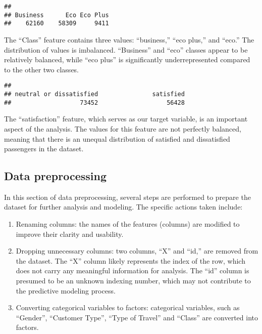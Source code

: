 \documentclass[
]{article}
\newenvironment{Shaded}{\begin{snugshade}}{\end{snugshade}}
\newcommand{\FunctionTok}[1]{\textcolor[rgb]{0.13,0.29,0.53}{\textbf{#1}}}
\newcommand{\NormalTok}[1]{#1}
\newcommand{\SpecialCharTok}[1]{\textcolor[rgb]{0.81,0.36,0.00}{\textbf{#1}}}
\begin{document}
\begin{Shaded}
\end{Shaded}

\begin{verbatim}
## 
## Business      Eco Eco Plus 
##    62160    58309     9411
\end{verbatim}

The ``Class'' feature contains three values: ``business,'' ``eco plus,''
and ``eco.'' The distribution of values is imbalanced. ``Business'' and
``eco'' classes appear to be relatively balanced, while ``eco plus'' is
significantly underrepresented compared to the other two classes.

\begin{Shaded}
\end{Shaded}

\begin{verbatim}
## 
## neutral or dissatisfied               satisfied 
##                   73452                   56428
\end{verbatim}

The ``satisfaction'' feature, which serves as our target variable, is an
important aspect of the analysis. The values for this feature are not
perfectly balanced, meaning that there is an unequal distribution of
satisfied and dissatisfied passengers in the dataset.

\hypertarget{data-preprocessing}{%
\subsection{Data preprocessing}\label{data-preprocessing}}

In this section of data preprocessing, several steps are performed to
prepare the dataset for further analysis and modeling. The specific
actions taken include:

\begin{enumerate}
\def\labelenumi{\arabic{enumi}.}
\item
  Renaming columns: the names of the features (columns) are modified to
  improve their clarity and usability.
\item
  Dropping unnecessary columns: two columns, ``X'' and ``id,'' are
  removed from the dataset. The ``X'' column likely represents the index
  of the row, which does not carry any meaningful information for
  analysis. The ``id'' column is presumed to be an unknown indexing
  number, which may not contribute to the predictive modeling process.
\item
  Converting categorical variables to factors: categorical variables,
  such as ``Gender'', ``Customer Type'', ``Type of Travel'' and
  ``Class'' are converted into factors.
\end{enumerate}
\end{document}
